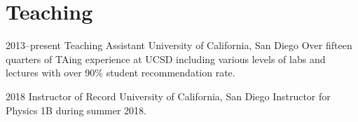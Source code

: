 \documentclass[]{friggeri-cv} %
\begin{document}
\section{Teaching}

\begin{entrylist}

\entry
{2013--present}
{Teaching Assistant}
{University of California, San Diego}
{
Over fifteen quarters of TAing experience at UCSD including various levels of labs and lectures with over 90\% student recommendation rate. 
}


\entry
{2018}
{Instructor of Record}
{University of California, San Diego}
{Instructor for Physics 1B during summer 2018. }


\end{entrylist}
%
%
%
%
%
%
\end{document}
